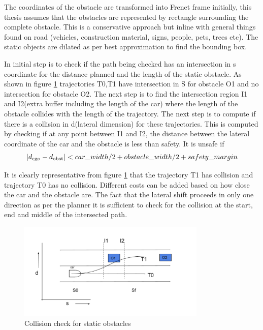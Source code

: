 The coordinates of the obstacle are transformed into Frenet frame initially, this thesis assumes that the obstacles are represented by rectangle surrounding the complete obstacle. This is a conservative approach but inline with general things found on road (vehicles, construction material, signs, people, pets, trees etc). The static objects are dilated as per best approximation to find the bounding box. 

In initial step is to check if the path being checked has an intersection in s coordinate for the distance planned and the length of the static obstacle. As shown in figure \ref{static_check} trajectories T0,T1 have intersection in S for obstacle O1 and no intersection for obstacle O2. The next step is to find the intersection region I1 and I2(extra buffer including the length of the car) where the length of the obstacle collides with the length of the trajectory. The next step is to compute if there is a collision in d(lateral dimension) for these trajectories. This is computed by checking if at any point between I1 and I2, the distance between the lateral coordinate of the car and the obstacle is less than safety. It is unsafe if 
\begin{equation}
    |d\textsubscript{ego} - d\textsubscript{obst}| < car\_width/2 + obstacle\_width/2 + safety\_margin
    \label{static_obst_safety_dist}
\end{equation}

It is clearly representative from figure \ref{static_check} that the trajectory T1 has collision and trajectory T0 has no collision. Different costs can be added based on how close the car and the obstacle are. The fact that the lateral shift proceeds in only one direction as per the planner it is sufficient to check for the collision at the start, end and middle of the intersected path. 


 \begin{figure}[H]
    \centering
    \includegraphics[width=0.8\textwidth]{Images/static_check.png}
    \caption{Collision check for static obstacles}
    \label{static_check}
\end{figure}



